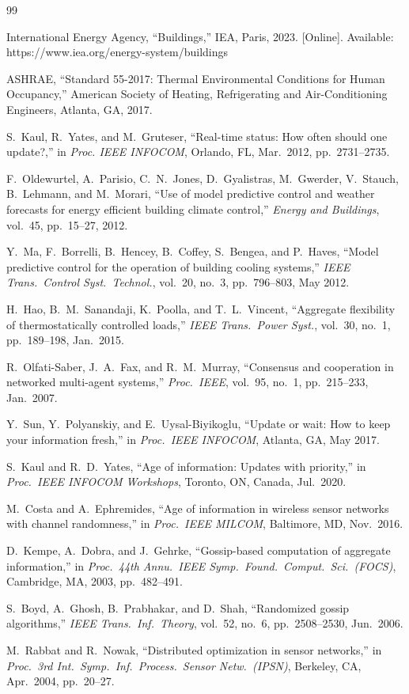 \documentclass[conference]{IEEEtran}
\begin{document}
\begin{thebibliography}{99}

International Energy Agency, ``Buildings,'' IEA, Paris, 2023. [Online].
Available: https://www.iea.org/energy-system/buildings

ASHRAE, ``Standard 55-2017: Thermal Environmental Conditions for Human
Occupancy,'' American Society of Heating, Refrigerating and Air-Conditioning
Engineers, Atlanta, GA, 2017.

S.~Kaul, R.~Yates, and M.~Gruteser, ``Real-time status: How often should one
update?,'' in \textit{Proc. IEEE INFOCOM}, Orlando, FL, Mar.\ 2012,
pp.~2731--2735.

F.~Oldewurtel, A.~Parisio, C.~N.~Jones, D.~Gyalistras, M.~Gwerder,
V.~Stauch, B.~Lehmann, and M.~Morari, ``Use of model predictive control and
weather forecasts for energy efficient building climate control,''
\textit{Energy and Buildings}, vol.~45, pp.~15--27, 2012.

Y.~Ma, F.~Borrelli, B.~Hencey, B.~Coffey, S.~Bengea, and P.~Haves,
``Model predictive control for the operation of building cooling systems,''
\textit{IEEE Trans.\ Control Syst.\ Technol.}, vol.~20, no.~3,
pp.~796--803, May 2012.

H.~Hao, B.~M.~Sanandaji, K.~Poolla, and T.~L.~Vincent, ``Aggregate
flexibility of thermostatically controlled loads,'' \textit{IEEE Trans.\
Power Syst.}, vol.~30, no.~1, pp.~189--198, Jan.\ 2015.

R.~Olfati-Saber, J.~A.~Fax, and R.~M.~Murray, ``Consensus and cooperation in
networked multi-agent systems,'' \textit{Proc.\ IEEE}, vol.~95, no.~1,
pp.~215--233, Jan.\ 2007.

Y.~Sun, Y.~Polyanskiy, and E.~Uysal-Biyikoglu, ``Update or wait: How to keep
your information fresh,'' in \textit{Proc.\ IEEE INFOCOM}, Atlanta, GA,
May 2017.

S.~Kaul and R.~D.~Yates, ``Age of information: Updates with priority,''
in \textit{Proc.\ IEEE INFOCOM Workshops}, Toronto, ON, Canada, Jul.\ 2020.

M.~Costa and A.~Ephremides, ``Age of information in wireless sensor networks
with channel randomness,'' in \textit{Proc.\ IEEE MILCOM}, Baltimore, MD,
Nov.\ 2016.

D.~Kempe, A.~Dobra, and J.~Gehrke, ``Gossip-based computation of aggregate
information,'' in \textit{Proc.\ 44th Annu.\ IEEE Symp.\ Found.\ Comput.\
Sci.\ (FOCS)}, Cambridge, MA, 2003, pp.~482--491.

S.~Boyd, A.~Ghosh, B.~Prabhakar, and D.~Shah, ``Randomized gossip
algorithms,'' \textit{IEEE Trans.\ Inf.\ Theory}, vol.~52, no.~6,
pp.~2508--2530, Jun.\ 2006.

M.~Rabbat and R.~Nowak, ``Distributed optimization in sensor networks,''
in \textit{Proc.\ 3rd Int.\ Symp.\ Inf.\ Process.\ Sensor Netw.\ (IPSN)},
Berkeley, CA, Apr.\ 2004, pp.~20--27.

\end{thebibliography}
\end{document}
